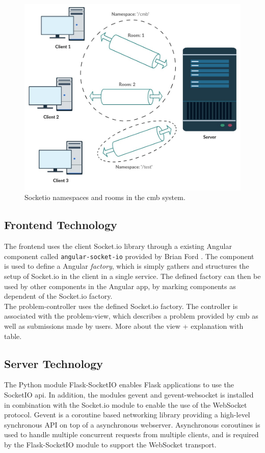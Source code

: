 \begin{figure}
    \includegraphics[width=1.0\textwidth]{figs/namespaces_and_rooms.jpg}
    \caption[Socketio namespaces and rooms in the \gls{cmb} system]{Socketio namespaces and rooms in the \gls{cmb} system. }
    \label{fig:namespaces-and-rooms}
\end{figure}

\subsection{Frontend Technology}
The frontend uses the client Socket.io library \cite{SOCKETIO} through a existing Angular component called \texttt{angular-socket-io} provided by Brian Ford \cite{ANGULARSOCKETIO}. The component is used to define a Angular \textit{factory}, which is simply gathers and structures the setup of Socket.io in the client in a single service. The defined factory can then be used by other components in the Angular app, by marking components as dependent of the Socket.io factory. \\

The problem-controller uses the defined Socket.io factory. The controller is associated with the problem-view, which describes a problem provided by \gls{cmb} as well as submissions made by users. More about the view + explanation with table.

\subsection{Server Technology}
The Python module Flask-SocketIO \cite{FLASKSOCKETIO} enables Flask applications to use the SocketIO \gls{api}. In addition, the modules gevent \cite{GEVENT} and gevent-websocket \cite{GEVENTWEBSOCKET} is installed in combination with the Socket.io module to enable the use of the WebSocket protocol. Gevent is a coroutine based networking library providing a high-level synchronous API on top of a asynchronous webserver. Asynchronous coroutines is used to handle multiple concurrent requests from multiple clients, and is required by the Flask-SocketIO module to support the WebSocket transport. \\

